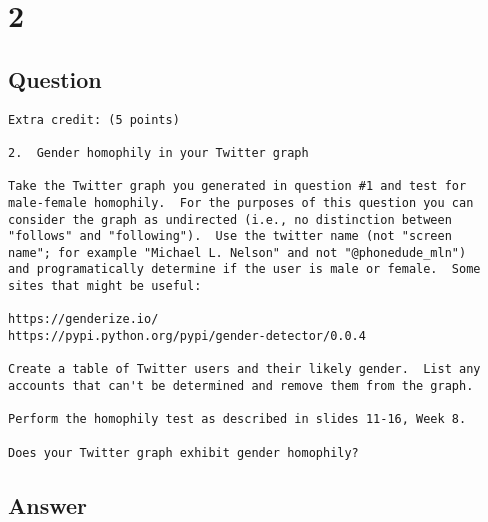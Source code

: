 \documentclass[letterpaper,11pt]{article}
\newcommand*{\srcPath}{../src}%
\begin{document}

% 



\clearpage


\section*{2}

\subsection*{Question}

\begin{verbatim}
Extra credit: (5 points)

2.  Gender homophily in your Twitter graph 

Take the Twitter graph you generated in question #1 and test for
male-female homophily.  For the purposes of this question you can
consider the graph as undirected (i.e., no distinction between
"follows" and "following").  Use the twitter name (not "screen
name"; for example "Michael L. Nelson" and not "@phonedude_mln")
and programatically determine if the user is male or female.  Some
sites that might be useful:

https://genderize.io/
https://pypi.python.org/pypi/gender-detector/0.0.4

Create a table of Twitter users and their likely gender.  List any 
accounts that can't be determined and remove them from the graph.

Perform the homophily test as described in slides 11-16, Week 8.

Does your Twitter graph exhibit gender homophily?
\end{verbatim}

\clearpage
\subsection*{Answer}
\end{document}
